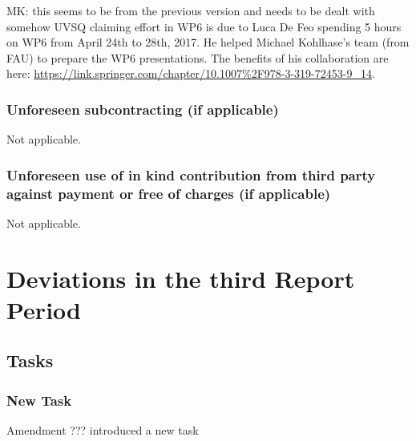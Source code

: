 \begin{oldpart}{MK: this seems to be from the previous version and needs to be dealt with somehow}
UVSQ claiming effort in WP6 is due to Luca De Feo spending 5 hours on WP6 from April 24th to 28th, 2017. He helped Michael 
Kohlhase's team (from FAU) to prepare the WP6 presentations. The benefits of his collaboration are here:
\url{https://link.springer.com/chapter/10.1007%2F978-3-319-72453-9_14}.

\subsubsection{Unforeseen subcontracting (if applicable)}

Not applicable.

\subsubsection{Unforeseen use of in kind contribution from third party against payment or
  free of charges (if applicable)}

 Not applicable. 
\end{oldpart}


\section{Deviations in the third Report Period}

\subsection{Tasks}

\subsubsection{New Task }
Amendment ??? introduced a new task  

